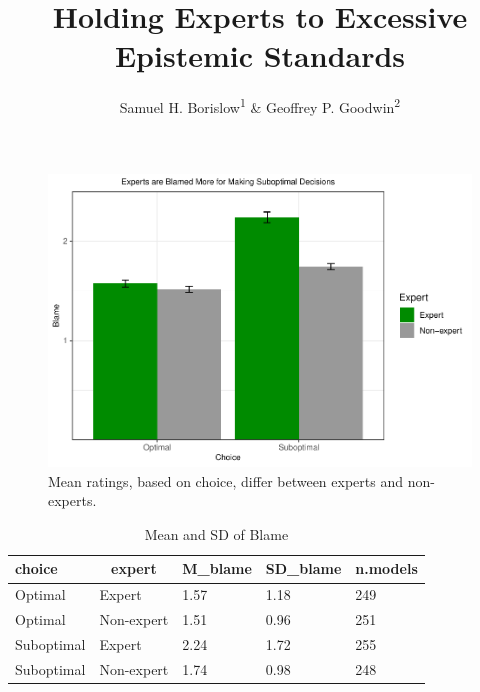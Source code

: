 \documentclass[
  man,floatsintext]{apa6}
\title{Holding Experts to Excessive Epistemic Standards}
\author{Samuel H. Borislow\textsuperscript{1} \& Geoffrey P. Goodwin\textsuperscript{2}}
\date{}
\affiliation{\vspace{0.5cm}\textsuperscript{1} University of Chicago\\\textsuperscript{2} University of Pennsylvania}
\begin{document}
\maketitle



\begin{figure}
\centering
\includegraphics{2-16_in-class_ScientificReportManuscriptDraft2_files/figure-latex/fig-plot-1-1.pdf}
\caption{\label{fig:fig-plot-1}Mean ratings, based on choice, differ between experts and non-experts.}
\end{figure}

\begin{table}[tbp]

\begin{center}
\begin{threeparttable}

\caption{\label{tab:table-table1}Mean and SD of Blame}

\begin{tabular}{lllll}
\toprule
choice & \multicolumn{1}{c}{expert} & \multicolumn{1}{c}{M\_blame} & \multicolumn{1}{c}{SD\_blame} & \multicolumn{1}{c}{n.models}\\
\midrule
Optimal & Expert & 1.57 & 1.18 & 249\\
Optimal & Non-expert & 1.51 & 0.96 & 251\\
Suboptimal & Expert & 2.24 & 1.72 & 255\\
Suboptimal & Non-expert & 1.74 & 0.98 & 248\\
\bottomrule
\end{tabular}

\end{threeparttable}
\end{center}

\end{table}
\end{document}
